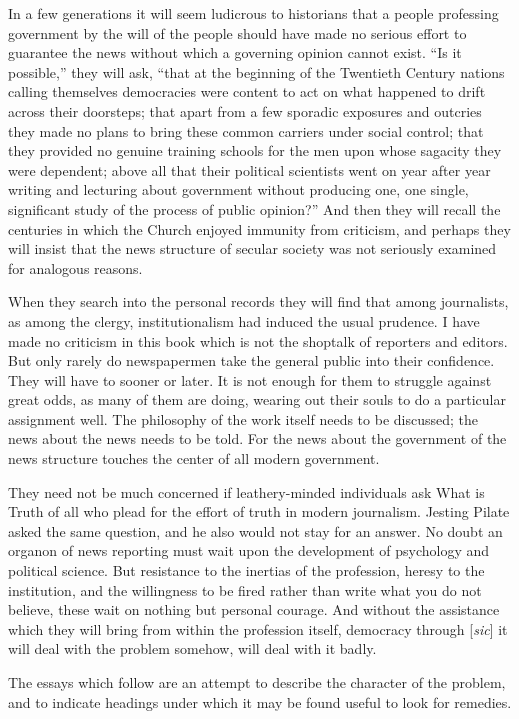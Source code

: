 \documentclass[openany,nobib,nohyper]{tufte-book}
\begin{document}
In a few generations it will seem ludicrous to historians that a people
professing government by the will of the people should have made no
serious effort to guarantee the news without which a governing opinion
cannot exist. ``Is it possible,'' they will ask, ``that at the beginning
of the Twentieth Century nations calling themselves democracies were
content to act on what happened to drift across their doorsteps; that
apart from a few sporadic exposures and outcries they made no plans to
bring these common carriers under social control; that they provided no
genuine training schools for the men upon whose sagacity they were
dependent; above all that their political scientists went on year after
year writing and lecturing about government without producing one, one
single, significant study of the process of public opinion?'' And then
they will recall the centuries in which the Church enjoyed immunity from
criticism, and perhaps they will insist that the news structure of
secular society was not seriously examined for analogous reasons.

When they search into the personal records they will find that among
journalists, as among the clergy, institutionalism had induced the usual
prudence. I have made no criticism in this book which is not the
shoptalk of reporters and editors. But only rarely do newspapermen take
the general public into their confidence. They will have to sooner or
later. It is not enough for them to struggle against great odds, as many
of them are doing, wearing out their souls to do a particular assignment
well. The philosophy of the work itself needs to be discussed; the news
about the news needs to be told. For the news about the government of
the news structure touches the center of all modern government.

They need not be much concerned if leathery-minded individuals ask What
is Truth of all who plead for the effort of truth in modern journalism.
Jesting Pilate asked the same question, and he also would not stay for
an answer. No doubt an organon of news reporting must wait upon the
development of psychology and political science. But resistance to the
inertias of the profession, heresy to the institution, and the
willingness to be fired rather than write what you do not believe, these
wait on nothing but personal courage. And without the assistance which
they will bring from within the profession itself, democracy through [\emph{sic}] it
will deal with the problem somehow, will deal with it badly.

The essays which follow are an attempt to describe the character of the
problem, and to indicate headings under which it may be found useful to
look for remedies.
\end{document}
